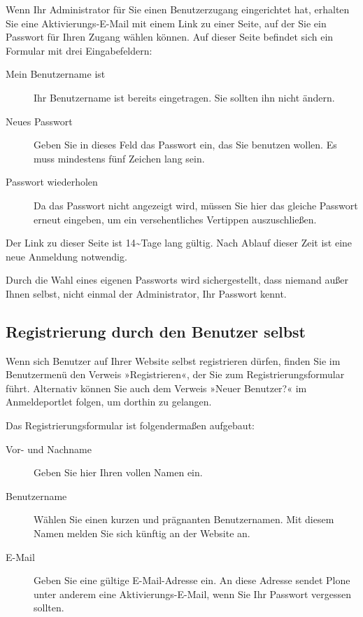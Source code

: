 \documentclass[a4paper,12pt,ngerman]{manual}
\begin{document}
Wenn Ihr Administrator für Sie einen Benutzerzugang eingerichtet hat,
erhalten Sie eine Aktivierungs-E-Mail mit einem Link zu einer Seite,
auf der Sie ein Passwort für Ihren Zugang wählen können. Auf dieser
Seite befindet sich ein Formular mit drei Eingabefeldern:
\begin{description}
\item[Mein Benutzername ist] \leavevmode
Ihr Benutzername ist bereits eingetragen. Sie
sollten ihn nicht ändern.

\item[Neues Passwort] \leavevmode
Geben Sie in dieses Feld das Passwort ein, das Sie
benutzen wollen. Es muss mindestens fünf Zeichen lang sein.

\item[Passwort wiederholen] \leavevmode
Da das Passwort nicht angezeigt wird, müssen Sie
hier das gleiche Passwort erneut eingeben, um ein versehentliches Vertippen
auszuschließen.

\end{description}

Der Link zu dieser Seite ist 14\textasciitilde{}Tage lang gültig. Nach Ablauf dieser Zeit ist
eine neue Anmeldung notwendig.

Durch die Wahl eines eigenen Passworts wird sichergestellt, dass
niemand außer Ihnen selbst, nicht einmal der Administrator, Ihr
Passwort kennt.
\hypertarget{sec-registr-durch-den-1}{}

\subsection{Registrierung durch den Benutzer selbst}

Wenn sich Benutzer auf Ihrer Website selbst registrieren dürfen,
finden Sie im Benutzermenü den Verweis »Registrieren«, der Sie zum
Registrierungsformular führt. Alternativ können Sie auch dem Verweis »Neuer
Benutzer?« im Anmeldeportlet folgen, um dorthin zu gelangen.

Das Registrierungsformular ist folgendermaßen aufgebaut:
\begin{description}
\item[Vor- und Nachname] \leavevmode
Geben Sie hier Ihren vollen Namen ein.

\item[Benutzername] \leavevmode
Wählen Sie einen kurzen und prägnanten Benutzernamen. Mit
diesem Namen melden Sie sich künftig an der Website an.

\item[E-Mail] \leavevmode
Geben Sie eine gültige E-Mail-Adresse ein. An diese Adresse
sendet Plone unter anderem eine Aktivierungs-E-Mail, wenn Sie Ihr Passwort
vergessen sollten.

\end{description}
\end{document}
